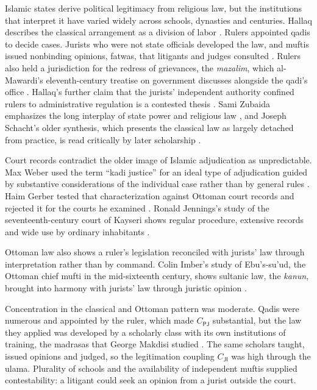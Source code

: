 \documentclass[11pt,letterpaper]{article}
\theoremstyle{definition}
\theoremstyle{remark}
\newcommand{\pP}{\mathsf{P}}
\newcommand{\pJ}{\mathsf{J}}
\newcommand{\pI}{\mathsf{I}}
\begin{document}
Islamic states derive political legitimacy from religious law, but the institutions that interpret it have varied widely across schools, dynasties and centuries. Hallaq describes the classical arrangement as a division of labor \citep{hallaq2009}. Rulers appointed qadis to decide cases. Jurists who were not state officials developed the law, and muftis issued nonbinding opinions, fatwas, that litigants and judges consulted \citep{masud1996}. Rulers also held a jurisdiction for the redress of grievances, the \emph{mazalim}, which al-Mawardi's eleventh-century treatise on government discusses alongside the qadi's office \citep{mawardi1996}. Hallaq's further claim that the jurists' independent authority confined rulers to administrative regulation is a contested thesis \citep{hallaq2009,hallaq2013}. Sami Zubaida emphasizes the long interplay of state power and religious law \citep{zubaida2003}, and Joseph Schacht's older synthesis, which presents the classical law as largely detached from practice, is read critically by later scholarship \citep{schacht1964}.

Court records contradict the older image of Islamic adjudication as unpredictable. Max Weber used the term ``kadi justice'' for an ideal type of adjudication guided by substantive considerations of the individual case rather than by general rules \citep{weber1978}. Haim Gerber tested that characterization against Ottoman court records and rejected it for the courts he examined \citep{gerber1994}. Ronald Jennings's study of the seventeenth-century court of Kayseri shows regular procedure, extensive records and wide use by ordinary inhabitants \citep{jennings1978}.

Ottoman law also shows a ruler's legislation reconciled with jurists' law through interpretation rather than by command. Colin Imber's study of Ebu's-su'ud, the Ottoman chief mufti in the mid-sixteenth century, shows sultanic law, the \emph{kanun}, brought into harmony with jurists' law through juristic opinion \citep{imber1997}.

Concentration in the classical and Ottoman pattern was moderate. Qadis were numerous and appointed by the ruler, which made $C_{\pP\pJ}$ substantial, but the law they applied was developed by a scholarly class with its own institutions of training, the madrasas that George Makdisi studied \citep{makdisi1981}. The same scholars taught, issued opinions and judged, so the legitimation coupling $C_{\pJ\pI}$ was high through the ulama. Plurality of schools and the availability of independent muftis supplied contestability: a litigant could seek an opinion from a jurist outside the court.
\end{document}
